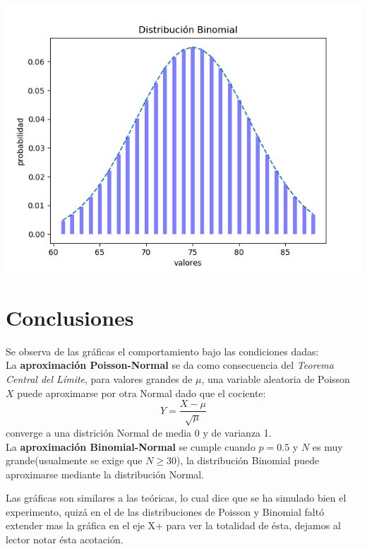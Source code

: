 \documentclass[12pt,a4paper]{article}
\begin{document}
\begin{multicols}{2}
\begin{itemize}
        \includegraphics[scale=0.5]{binomial_normal_4.png}
    \end{itemize}
\section{Conclusiones}
    Se observa de las gráficas el comportamiento bajo las condiciones dadas:\\
    La \textbf{aproximación Poisson-Normal} se da como consecuencia del \textit{Teorema Central del Límite}, para valores grandes de $\mu$, una variable aleatoria de Poisson $X$ puede aproximarse por otra Normal dado que el cociente:
    $$Y=\frac{X-\mu}{\sqrt{\mu}}$$
    converge a una districión Normal de media 0 y de varianza 1.\\
    La \textbf{aproximación Binomial-Normal} se cumple cuando $p=0.5$ y $N$ es muy grande(usualmente se exige que $N\geq30$), la distribución Binomial puede aproximarse mediante la distribución Normal.
    
    Las gráficas son similares a las teóricas, lo cual dice que se ha simulado bien el experimento, quizá en el de las distribuciones de Poisson y Binomial faltó extender mas la gráfica en el eje X+ para ver la totalidad de ésta, dejamos al lector notar ésta acotación. 

\end{multicols}
\end{document}
